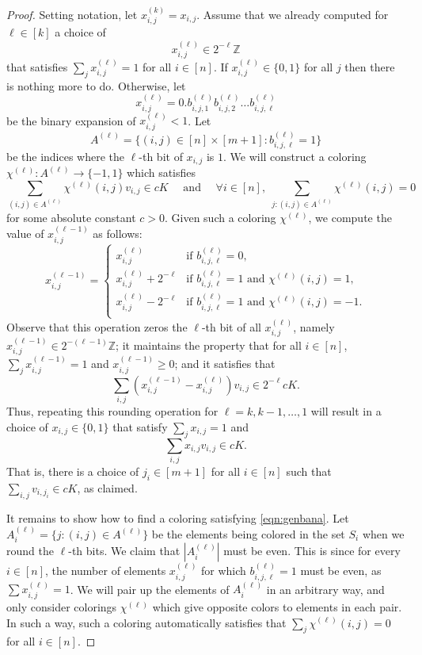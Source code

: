\documentclass[11pt]{article}
\numberwithin{equation}{section}
\theoremstyle{definition}
\theoremstyle{plain}
\begin{document}
\begin{proof}
Setting notation, let $x^{(k)}_{i,j} = x_{i,j}$. Assume that we already computed for $\ell \in [k]$ a choice of
\[
  x^{(\ell)}_{i,j} \in 2^{-\ell} \mathbb{Z}
\]
that satisfies $\sum_j x^{(\ell)}_{i,j}=1$ for all $i \in [n]$. If
$x^{(\ell)}_{i,j} \in \{0,1\}$ for all $j$ then there is nothing more
to do.  Otherwise, let
\[
  x^{(\ell)}_{i,j}=0.b^{(\ell)}_{i,j,1}b^{(\ell)}_{i,j,2}\dots b^{(\ell)}_{i,j,\ell}
\]
be the binary expansion of $x^{(\ell)}_{i,j}<1$.  Let
\[
  A^{(\ell)}=\{(i,j) \in [n] \times [m+1]: b^{(\ell)}_{i,j,\ell}=1\}
\]
be the indices where the $\ell$-th bit of $x_{i,j}$ is $1$.  We will
construct a coloring $\chi^{(\ell)}:A^{(\ell)} \to \{-1,1\}$ which
satisfies
\begin{equation}
\label{eqn:genbana}
 \sum_{(i,j) \in A^{(\ell)}} \chi^{(\ell)}(i,j) v_{i,j} \in c K \quad\text{ and }\quad \forall i\in[n], \; \sum_{j: (i,j) \in A^{(\ell)}}\chi^{(\ell)}(i,j)=0
\end{equation}
for some absolute constant $c>0$. Given such a coloring $\chi^{(\ell)}$, we compute the value of $x^{(\ell-1)}_{i,j}$ as follows:
\[
x^{(\ell-1)}_{i,j} =
\begin{cases}
x^{(\ell)}_{i,j} & \text{if } b_{i,j,\ell}^{(\ell)}=0,\\
x^{(\ell)}_{i,j}+2^{-\ell} & \text{if } b_{i,j,\ell}^{(\ell)}=1 \text{ and } \chi^{(\ell)}(i,j)=1,\\
x^{(\ell)}_{i,j}-2^{-\ell} & \text{if } b_{i,j,\ell}^{(\ell)}=1 \text{ and } \chi^{(\ell)}(i,j)=-1.\\
\end{cases}
\]
Observe that this operation zeros the $\ell$-th bit of all $x^{(\ell)}_{i,j}$, namely $x^{(\ell-1)}_{i,j} \in 2^{-(\ell-1)} \mathbb{Z}$;
it maintains the property that for all $i \in [n]$, $\sum_{j} x^{(\ell-1)}_{i,j}=1$ and $x_{i,j}^{(\ell-1)} \ge 0$;
and it satisfies that
$$
\sum_{i,j} \left( x^{(\ell-1)}_{i,j} - x^{(\ell)}_{i,j} \right) v_{i,j} \in 2^{-\ell} cK.
$$
Thus, repeating this rounding operation for $\ell=k,k-1,\ldots,1$ will result in a choice of $x_{i,j} \in \{0,1\}$ that satisfy $\sum_j x_{i,j}=1$ and
$$
\sum_{i,j} x_{i,j} v_{i,j} \in c K.
$$
That is, there is a choice of $j_i \in [m+1]$ for all $i \in [n]$ such that $\sum_{i,j} v_{i,j_i} \in c K$, as claimed.

It remains to show how to find a coloring satisfying \eqref{eqn:genbana}. Let $A^{(\ell)}_i=\{j: (i,j) \in A^{(\ell)}\}$ be the elements being colored in the set $S_i$ when we
round the $\ell$-th bits. We claim that $|A^{(\ell)}_i|$ must be even. This is since for every $i \in [n]$, the number of elements $x^{(\ell)}_{i,j}$
for which $b^{(\ell)}_{i,j,\ell}=1$ must be even, as $\sum x^{(\ell)}_{i,j}=1$. We will pair up the elements of $A^{(\ell)}_i$ in an arbitrary way, and only consider
colorings $\chi^{(\ell)}$ which give opposite colors to elements in each pair. In such a way, such a coloring automatically satisfies that $\sum_j \chi^{(\ell)}(i,j)=0$ for all $i \in [n]$.


\end{proof}
\end{document}

